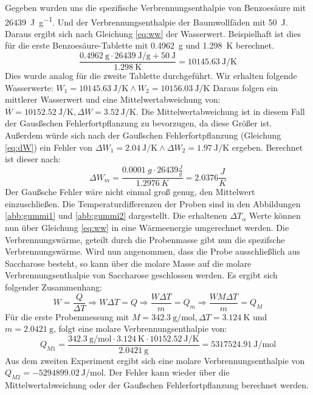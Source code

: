 Gegeben wurden uns die spezifische Verbrennungsenthalpie von Benzoesäure mit \qty{26439}{\joule\per\gram}\cite{skript}.
Und der Verbrennungsenthalpie der Baumwollfäden mit \qty{50}{\joule}.
Daraus ergibt sich nach Gleichung \ref{eq:ww} der Wasserwert.
Beispielhaft ist dies für die erste Benzoesäure-Tablette mit \qty{0,4962}{\gram} und \qty{1,298}{\kelvin} berechnet.
$$ \frac{\qty{0,4962}{\gram}\cdot\qty{26439}{\joule\per\gram}+\qty{50}{\joule}}{\qty{1,298}{\kelvin}} = \qty{10145,63}{\joule\per\kelvin}$$ 
Dies wurde analog für die zweite Tablette durchgeführt.
Wir erhalten folgende Wasserwerte: $W_1= \qty{10145,63}{\joule\per\kelvin}\wedge W_2=\qty{10156,03}{\joule\per\kelvin}$
Daraus folgen ein mittlerer Wasserwert und eine Mittelwertabweichung von: $ \overline{W}=\qty{10152,52}{\joule\per\kelvin}, \Delta W = \qty{3,52}{\joule\per\kelvin}$.
Die Mittelwertabweichung ist in diesem Fall der Gausßschen Fehlerfortpflanzung zu bevorzugen, da diese Größer ist.
Außerdem würde sich nach der Gaußschen Fehlerfortpflanzung (Gleichung \ref{eq:dW}) ein Fehler von $\Delta W_1=\qty{2,04}{\joule\per\kelvin}\wedge\Delta W_2=\qty{1,97}{\joule\per\kelvin}$ ergeben.
Berechnet ist dieser nach:
$$\Delta W_m = \frac{0.0001\ g \cdot 26439 \frac{J}{g}}{1.2976\ K} = 2.0376 \frac{J}{K}$$  
Der Gaußsche Fehler wäre nicht einmal groß genug, den Mittelwert einzuschließen.
Die Temperaturdifferenzen der Proben sind in den Abbildungen \ref{abb:gummi1} und \ref{abb:gummi2} dargestellt.
Die erhaltenen $\Delta T_\alpha$ Werte können nun über Gleichung \ref{eq:ww} in eine Wärmeenergie umgerechnet werden.
Die Verbrennungswärme, geteilt durch die Probenmasse gibt nun die spezifsche Verbrennungswärme. 
Wird nun angenommen, dass die Probe ausschließlich aus Saccharose besteht, so kann über die molare Masse auf die molare Verbrennungsenthalpie von Saccharose geschlossen werden.
Es ergibt sich folgender Zusammenhang:
$$ W=\frac{Q}{\Delta T} \Rightarrow W\Delta T = Q \Rightarrow \frac{W\Delta T}{m} = Q_m \Rightarrow \frac{WM\Delta T}{m} = Q_M$$
Für die erste Probenmessung mit $M=\qty{342,3}{\gram\per\mole}, \Delta T=\qty{3,124}{\kelvin}$ und $m=\qty{2,0421}{\gram}$, folgt eine molare Verbrennungsenthalpie von:
$$ Q_{M1} = \frac{\qty{342,3}{\gram\per\mole}\cdot \qty{3,124}{\kelvin}\cdot\qty{10152,52}{\joule\per\kelvin}}{\qty{2,0421}{\gram}} = \qty{5317524,91}{\joule\per\mole}$$
Aus dem zweiten Experiment ergibt sich eine molare Verbrennungsenthalpie von \\$Q_{M2}=\qty{-5294899,02}{\joule\per\mole}$.
Der Fehler kann wieder über die Mittelwertabweichung oder der Gaußschen Fehlerfortpflanzung berechnet werden.

